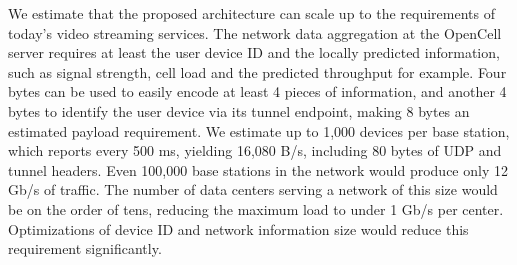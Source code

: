 We estimate that the proposed architecture can scale up to the requirements of today's video streaming services. The network data aggregation at the OpenCell server requires at least the user device ID and the locally predicted information, such as signal strength, cell load and the predicted throughput for example. Four bytes can be used to easily encode at least 4 pieces of information, and another 4 bytes to identify the user device via its tunnel endpoint, making 8 bytes an estimated payload requirement. We estimate up to 1,000 devices per base station, which reports every 500 ms, yielding 16,080 B/s, including 80 bytes of UDP and tunnel headers. Even 100,000 base stations in the network would produce only 12 Gb/s of traffic. The number of data centers serving a network of this size would be on the order of tens, reducing the maximum load to under 1 Gb/s per center. Optimizations of device ID and network information size would reduce this requirement significantly.










